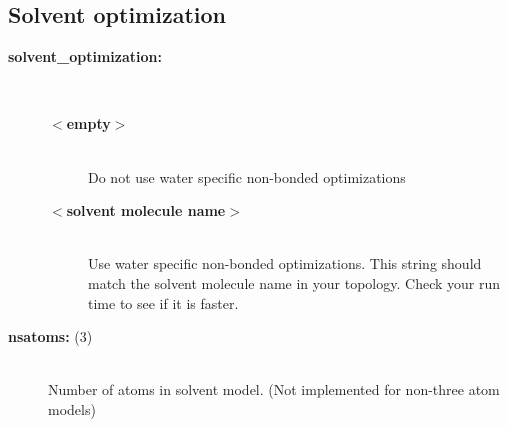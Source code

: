 \subsection{ Solvent optimization}
\begin{description}
\item[{\bf solvent\_optimization:}]\mbox{}\\
\vspace{-2ex}\begin{description}
\item[{\bf $<$empty$>$}]\mbox{}\\
Do not use water specific non-bonded optimizations
\item[{\bf $<$solvent molecule name$>$}]\mbox{}\\
Use water specific non-bonded optimizations. This string should match the
solvent molecule name in your topology. Check your run time to see 
if it is faster. 
\end{description}
\item[{\bf nsatoms: }(3)]\mbox{}\\
Number of atoms in solvent model.
(Not implemented for non-three atom models)
\end{description}


